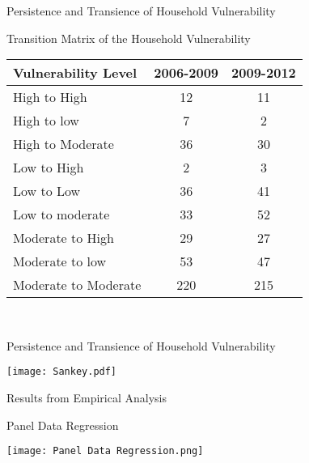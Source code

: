 \documentclass{beamer}
\begin{document}
	\begin{frame}{Persistence and Transience of Household Vulnerability}
		\begin{block}{Transition Matrix of the Household Vulnerability}
			\begin{table}[H]
				\begin{center}
					\begin{tabular}{lcc} \hline
						\textbf{Vulnerability Level} & \textbf{2006-2009} & \textbf{2009-2012} \\ \hline
						High to High                 & 12                 & 11                 \\
						High to low                  & 7                  & 2                  \\
						High to Moderate             & 36                 & 30                 \\
						Low to High                  & 2                  & 3                  \\
						Low to Low                   & 36                 & 41                 \\
						Low to moderate              & 33                 & 52                 \\
						Moderate to High             & 29                 & 27                 \\
						Moderate to low              & 53                 & 47                 \\
						Moderate to Moderate         & 220                & 215       \\ \hline \hline        
					\end{tabular} \\
				\end{center}
			\end{table}
		\end{block}
	\end{frame}
	
	\begin{frame}{Persistence and Transience of Household Vulnerability}
		\begin{exampleblock}{}
			\begin{center}
				\texttt{[image: Sankey.pdf]}
			\end{center} 
		\end{exampleblock}
	\end{frame}
	
	\begin{frame}{Results from Empirical Analysis}
		\begin{exampleblock}{Panel Data Regression}
			\begin{center}
				\texttt{[image: Panel Data Regression.png]}
			\end{center} 
		\end{exampleblock}
	\end{frame}
	
\end{document}
